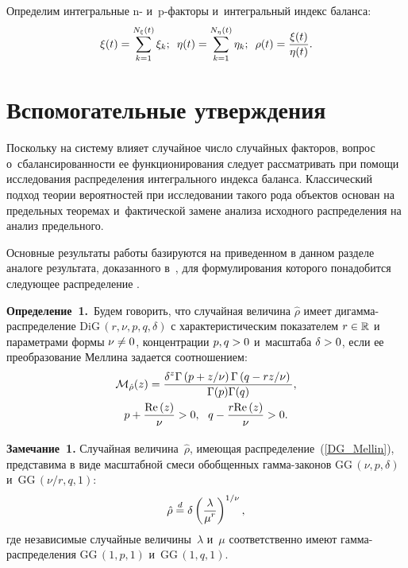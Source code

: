\begin{multicols}{2}
Определим интегральные n- и~p-фак\-то\-ры и~интегральный индекс баланса:
$$
\xi(t)=\sum\limits_{k=1}^{N_\xi(t)}\xi_k;\enskip
\eta(t)=\sum\limits_{k=1}^{N_\eta(t)}\eta_k;\enskip
\rho(t)=\displaystyle\frac{\displaystyle \xi(t)\mathstrut}{\displaystyle \eta(t)\mathstrut}.
$$

\section{Вспомогательные утверждения}

Поскольку на систему влияет случайное число случайных факторов, вопрос 
о~сбалансированности ее функционирования следует рассматривать при помощи 
исследования распределения интегрального индекса баланса. Классический подход 
теории вероятностей при исследовании такого рода объектов основан на предельных 
теоремах и~фактической замене анализа исходного распределения на анализ 
предельного.

Основные результаты работы базируются на приведенном в данном разделе аналоге 
результата, доказанного в~\cite{KuShe2022_1_ru}, для формулирования которого 
понадобится следующее распределение \cite{KuNeShe2022}.

\smallskip

\noindent
\textbf{Определение~1.}\ 
Будем говорить, что случайная величина ${\hat \rho}$ имеет ди\-гам\-ма-рас\-пре\-де\-ле\-ние 
$\mathrm{DiG}\,(r,\nu,p,q,\delta)$ с характеристическим показателем $r\hm\in\mathbb{R}$ и
параметрами формы $\nu\hm\neq0$, концентрации $p,q\hm>0$ и~масштаба $\delta\hm>0$, если 
ее преобразование Меллина задается соотношением:
\begin{multline}
\mathcal{M}_{{\hat \rho}}(z) = 
\fr{\delta^z\Gamma\left(p+{z}/{\nu}\right)\Gamma\left(q-{rz}/{\nu}\right)}{\Gamma(p)\Gamma(q)}, \\
 p+\fr{\mathrm{Re}\,(z)}{\nu}>0, \ \ q-\fr{r\mathrm{Re}\,(z)}{\nu}>0.
  \label{DG_Mellin}
\end{multline}


\noindent
\textbf{Замечание~1.}
Случайная величина~${\hat \rho}$, имеющая распределение~(\ref{DG_Mellin}), 
представима в виде масштабной смеси обобщенных гам\-ма-за\-ко\-нов $\mathrm{GG}\,(\nu,p,\delta)$ 
и~$\mathrm{GG}\,(\nu/r,q,1)$:
\begin{equation*}
\label{lambda_over_mu}
{\hat \rho}\stackrel{d}{=}\delta\left(\displaystyle\frac{\displaystyle \lambda\mathstrut}{\displaystyle \mu^r\mathstrut}\right)^{1/\nu},
\end{equation*}
где независимые случайные величины~$\lambda$ и~$\mu$ соответственно имеют гам\-ма-рас\-пре\-де\-ле\-ния $\mathrm{GG}\,(1,p,1)$ и~$\mathrm{GG}\,(1,q,1)$.


\end{multicols}

